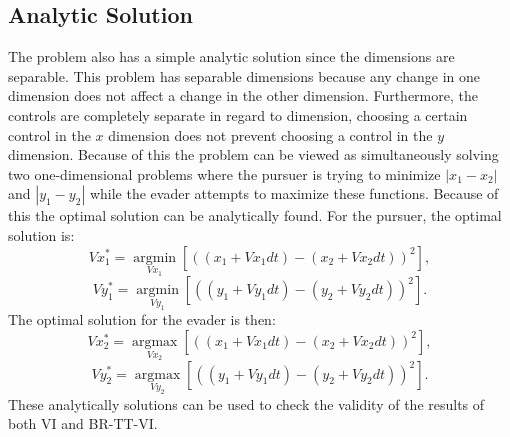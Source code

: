 \subsection{Analytic Solution}
The problem also has a simple analytic solution since the dimensions are separable. This problem has separable dimensions because any change in one dimension does not affect a change in the other dimension. Furthermore, the controls are completely separate in regard to dimension, choosing a certain control in the $x$ dimension does not prevent choosing a control in the $y$ dimension. Because of this the problem can be viewed as simultaneously solving two one-dimensional problems where the pursuer is trying to minimize $|x_1-x_2|$ and $|y_1-y_2|$ while the evader attempts to maximize these functions. Because of this the optimal solution can be analytically found. For the pursuer, the optimal solution is:
\begin{equation}\label{puroptx}
Vx_1^*= \underset{Vx_1 }{\operatorname{arg min }}[((x_1 + Vx_1dt)-(x_2+Vx_2dt))^2],
\end{equation}
\begin{equation}\label{puropty}
Vy_1^*= \underset{Vy_1 }{\operatorname{arg min }}[((y_1 + Vy_1dt)-(y_2+Vy_2dt))^2].
\end{equation}
The optimal solution for the evader is then:
\begin{equation}\label{evadoptx}
Vx_2^*= \underset{Vx_2 }{\operatorname{arg max }}[((x_1 + Vx_1dt)-(x_2+Vx_2dt))^2],
\end{equation}
\begin{equation}\label{evadopty}
Vy_2^*= \underset{Vy_2 }{\operatorname{arg max }}[((y_1 + Vy_1dt)-(y_2+Vy_2dt))^2].
\end{equation}
These analytically solutions can be used to check the validity of the results of both VI and BR-TT-VI. 


